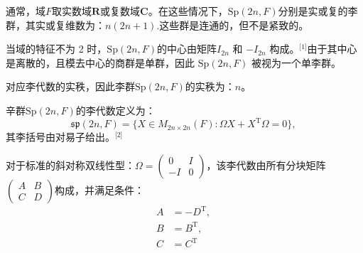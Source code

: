 通常，域$F$取实数域$\mathbf{R}$或复数域$\mathbf{C}$。在这些情况下，$\mathrm{Sp}(2n, F)$分别是实或复的李群，其实或复维数为：$n(2n+1)$.这些群是连通的，但不是紧致的。

当域的特征不为 2 时，$\mathrm{Sp}(2n, F)$的中心由矩阵$I_{2n}$ 和 $-I_{2n}$ 构成。\(^\text{[1]}\)由于其中心是离散的，且模去中心的商群是单群，因此 $\mathrm{Sp}(2n, F)$ 被视为一个单李群。

对应李代数的实秩，因此李群$\mathrm{Sp}(2n, F)$的实秩为：$n$。

辛群$\mathrm{Sp}(2n, F)$的李代数定义为：
$$
\mathfrak{sp}(2n,F) = \{ X \in M_{2n \times 2n}(F) : \Omega X + X^{\mathrm{T}} \Omega = 0 \},~
$$
其李括号由对易子给出。\(^\text{[2]}\)

对于标准的斜对称双线性型：$\Omega = \begin{pmatrix}0 & I \\- I & 0
\end{pmatrix}$，该李代数由所有分块矩阵$\begin{pmatrix}A & B \\C & D
\end{pmatrix}$构成，并满足条件：
$$
\begin{aligned}
A &= - D^{\mathrm{T}}, \\
B &= B^{\mathrm{T}}, \\
C &= C^{\mathrm{T}}
\end{aligned}~
$$
